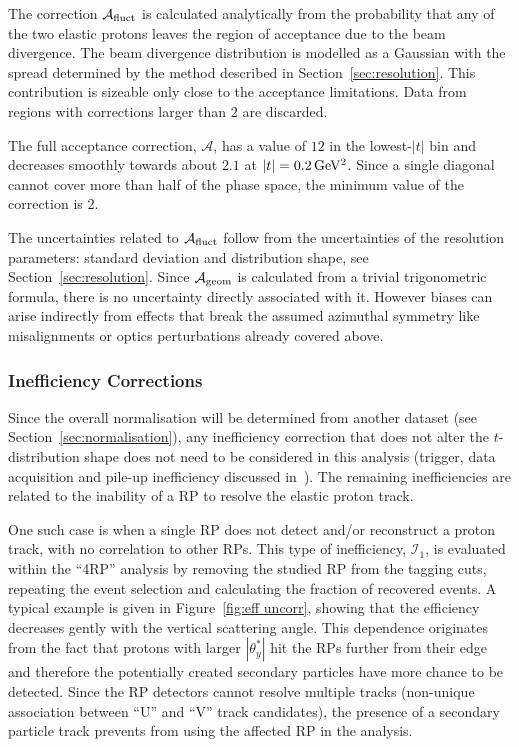 The correction $\mathcal{A}_{\rm fluct}$ is calculated analytically from the probability that any of the two elastic protons leaves the region of acceptance due to the beam divergence. The beam divergence distribution is modelled as a Gaussian with the spread determined by the method described in Section~\ref{sec:resolution}. This contribution is sizeable only close to the acceptance limitations. Data from regions with corrections larger than $2$ are discarded.

The full acceptance correction, $\mathcal{A}$, has a value of $12$ in the lowest-$|t|$ bin and decreases smoothly towards about $2.1$ at $|t| = 0.2\,{\rm GeV^2}$. Since a single diagonal cannot cover more than half of the phase space, the minimum value of the correction is $2$.

The uncertainties related to $\mathcal{A}_{\rm fluct}$ follow from the uncertainties of the resolution parameters: standard deviation and distribution shape, see Section~\ref{sec:resolution}. Since $\mathcal{A}_{\rm geom}$ is calculated from a trivial trigonometric formula, there is no uncertainty directly associated with it. However biases can arise indirectly from effects that break the assumed azimuthal symmetry like misalignments or optics perturbations already covered above.




\subsubsection{Inefficiency Corrections}
\label{sec:ineff corr}

Since the overall normalisation will be determined from another dataset (see Section~\ref{sec:normalisation}), any inefficiency correction that does not alter the $t$-distribution shape does not need to be considered in this analysis (trigger, data acquisition and pile-up inefficiency discussed in~\cite{totem-7tev-el,totem-8tev-tot1}). The remaining inefficiencies are related to the inability of a RP to resolve the elastic proton track.

One such case is when a single RP does not detect and/or reconstruct a proton track, with no correlation to other RPs. This type of inefficiency, $\mathcal{I}_1$, is evaluated within the ``4RP'' analysis by removing the studied RP from the tagging cuts, repeating the event selection and calculating the fraction of recovered events. A typical example is given in Figure~\ref{fig:eff uncorr}, showing that the efficiency decreases gently with the vertical scattering angle. This dependence originates from the fact that protons with larger $|\theta_y^*|$ hit the RPs further from their edge and therefore the potentially created secondary particles have more chance to be detected. Since the RP detectors cannot resolve multiple tracks (non-unique association between ``U'' and ``V'' track candidates), the presence of a secondary particle track prevents from using the affected RP in the analysis.

